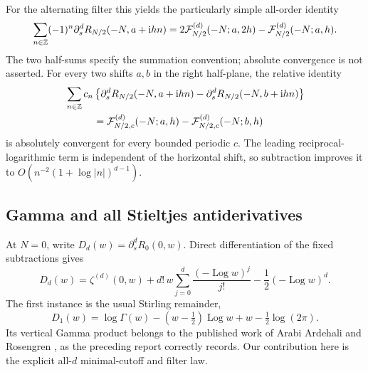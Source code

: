 \documentclass[11pt,letterpaper]{article}
\numberwithin{equation}{section}
\theoremstyle{definition}
\theoremstyle{remark}
\DeclareMathOperator{\Log}{Log}
\newcommand{\ii}{\mathrm i}
\begin{document}
For the alternating filter this yields the particularly simple
all-order identity
\begin{equation}\label{eq:alternating-all-jets}
 \sum_{n\in\mathbb Z}(-1)^n
      \partial_s^dR_{N/2}(-N,a+\ii hn)
 =
 2{\cal F}_{N/2}^{(d)}(-N;a,2h)
   -{\cal F}_{N/2}^{(d)}(-N;a,h).
\end{equation}
The two half-sums specify the summation convention; absolute
convergence is not asserted. For every two shifts \(a,b\) in the
right half-plane, the relative identity
\begin{equation}\label{eq:relative-lattice}
 \begin{split}
 &\sum_{n\in\mathbb Z}c_n
 \left\{\partial_s^dR_{N/2}(-N,a+\ii hn)
       -\partial_s^dR_{N/2}(-N,b+\ii hn)\right\}\\
 &\hspace{10mm}
 ={\cal F}_{N/2,c}^{(d)}(-N;a,h)
       -{\cal F}_{N/2,c}^{(d)}(-N;b,h)
 \end{split}
\end{equation}
is absolutely convergent for every bounded periodic \(c\).
The leading reciprocal-logarithmic term is independent of the
horizontal shift, so subtraction improves it to
\(O(n^{-2}(1+\log|n|)^{d-1})\).

\subsection{Gamma and all Stieltjes antiderivatives}

At \(N=0\), write \(D_d(w)=\partial_s^dR_0(0,w)\). Direct
differentiation of the fixed subtractions gives
\begin{equation}\label{eq:Dd-explicit}
 D_d(w)=\zeta^{(d)}(0,w)
       +d!\,w\sum_{j=0}^{d}\frac{(-\Log w)^j}{j!}
       -\frac12(-\Log w)^d.
\end{equation}
The first instance is the usual Stirling remainder,
\[
 D_1(w)=\log\Gamma(w)-(w-\tfrac12)\Log w+w-\tfrac12\log(2\pi).
\]
Its vertical Gamma product belongs to the published work of
Arabi Ardehali and Rosengren \cite{ArdehaliRosengren}, as the
preceding report correctly records. Our contribution here is the
explicit all-\(d\) minimal-cutoff and filter law.
\end{document}
